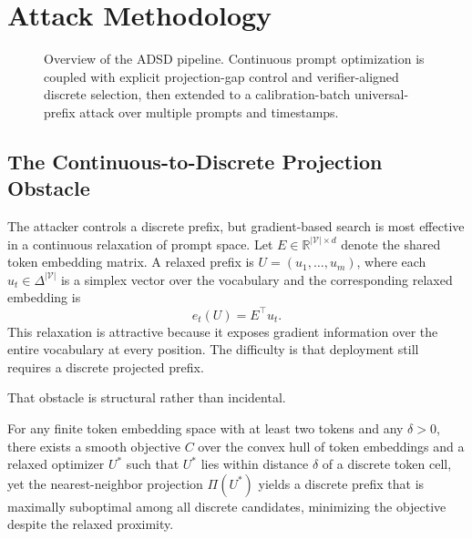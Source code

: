 \section{Attack Methodology}
\label{sec:method}

\begin{figure}[h!]
\centering
{}
\caption{Overview of the ADSD pipeline. Continuous prompt optimization is
coupled with explicit projection-gap control and verifier-aligned discrete
selection, then extended to a calibration-batch universal-prefix attack over
multiple prompts and timestamps.}
\label{fig:adsd-pipeline}
\end{figure}

\subsection{The Continuous-to-Discrete Projection Obstacle}

The attacker controls a discrete prefix, but gradient-based search is most
effective in a continuous relaxation of prompt space. Let
$E \in \mathbb{R}^{|\mathcal{V}| \times d}$ denote the shared token embedding
matrix. A relaxed prefix is
$U = (u_1, \dots, u_m)$, where each $u_t \in \Delta^{|\mathcal{V}|}$ is a
simplex vector over the vocabulary and the corresponding relaxed embedding is
\[
e_t(U) = E^\top u_t.
\]
This relaxation is attractive because it exposes gradient information over the
entire vocabulary at every position. The difficulty is that deployment still
requires a discrete projected prefix.

That obstacle is structural rather than incidental.

\begin{proposition}
\label{prop:waywardness}
For any finite token embedding space with at least two tokens and any
$\delta > 0$, there exists a smooth objective $C$ over the convex hull of token
embeddings and a relaxed optimizer $U^*$ such that $U^*$ lies within distance
$\delta$ of a discrete token cell, yet the nearest-neighbor projection
$\Pi(U^*)$ yields a discrete prefix that is maximally suboptimal among all
discrete candidates, minimizing the objective despite the relaxed proximity.
\end{proposition}

